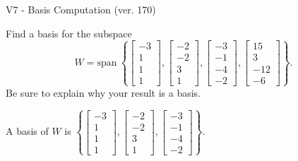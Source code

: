\begin{exercise}
  \begin{exerciseTitle}V7 - Basis Computation (ver. 170)\end{exerciseTitle}
  \begin{exerciseStatement}
    Find a basis for the subspace 
\[W=\mathrm{span}\ \left\{\left[\begin{array}{r}
-3 \\
1 \\
1 \\
1
\end{array}\right] , \left[\begin{array}{r}
-2 \\
-2 \\
3 \\
1
\end{array}\right] , \left[\begin{array}{r}
-3 \\
-1 \\
-4 \\
-2
\end{array}\right] , \left[\begin{array}{r}
15 \\
3 \\
-12 \\
-6
\end{array}\right]\right\}.\]
 Be sure to explain why your result is a basis.


  \end{exerciseStatement}
  \begin{exerciseAnswer}
   A basis of \(W\) is  \(\left\{\left[\begin{array}{r}
-3 \\
1 \\
1 \\
1
\end{array}\right] , \left[\begin{array}{r}
-2 \\
-2 \\
3 \\
1
\end{array}\right] , \left[\begin{array}{r}
-3 \\
-1 \\
-4 \\
-2
\end{array}\right]\right\}\).
  


  \end{exerciseAnswer}
\end{exercise}